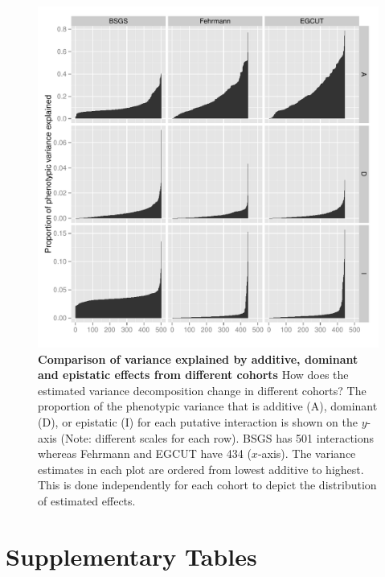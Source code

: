 \documentclass{article}
\begin{document}
\begin{figure}
	\centering
	\includegraphics[width=5in]{compare_vc2}
	\caption{\textbf{Comparison of variance explained by additive, dominant and epistatic effects from different cohorts} How does the estimated variance decomposition change in different cohorts? The proportion of the phenotypic variance that is additive (A), dominant (D), or epistatic (I) for each putative interaction is shown on the $y$-axis (Note: different scales for each row). BSGS has 501 interactions whereas Fehrmann and EGCUT have 434 ($x$-axis). The variance estimates in each plot are ordered from lowest additive to highest. This is done independently for each cohort to depict the distribution of estimated effects.}
	\label{fig:compare_vc}
\end{figure}





\clearpage
\section{Supplementary Tables}
\setcounter{table}{0}
\makeatletter 
\renewcommand{\thetable}{S\@arabic\c@table} 
\makeatletter 
\end{document}
